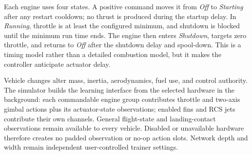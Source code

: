 Each engine uses four states. A positive command moves it from \emph{Off} to \emph{Starting} after any restart cooldown; no thrust is produced during the startup delay. In \emph{Running}, throttle is at least the configured minimum, and shutdown is blocked until the minimum run time ends. The engine then enters \emph{Shutdown}, targets zero throttle, and returns to \emph{Off} after the shutdown delay and spool-down. This is a timing model rather than a detailed combustion model, but it makes the controller anticipate actuator delay.

Vehicle changes alter mass, inertia, aerodynamics, fuel use, and control authority. The simulator builds the learning interface from the selected hardware in the background: each commandable engine group contributes throttle and two-axis gimbal actions plus its actuator-state observations; enabled fins and RCS jets contribute their own channels. General flight-state and landing-contact observations remain available to every vehicle. Disabled or unavailable hardware therefore creates no padded observation or no-op action slots. Network depth and width remain independent user-controlled trainer settings.
